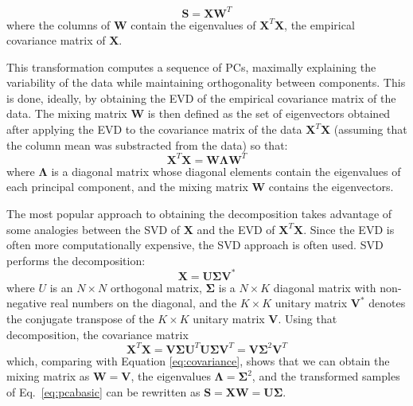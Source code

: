 \begin{equation}\label{eq:pcabasic}
	\mathbf{S}=\mathbf{X}\mathbf{W}^T
\end{equation}
where the columns of $\mathbf{W}$ contain the eigenvalues of $\mathbf{X}^T\mathbf{X}$, the empirical covariance matrix of $\mathbf{X}$. 

This transformation computes a sequence of PCs, maximally explaining the variability of the data while maintaining orthogonality between components. This is done, ideally, by obtaining the \ac{EVD} of the empirical covariance matrix of the data. The mixing matrix $\mathbf{W}$ is then defined as the set of eigenvectors obtained after applying the \ac{EVD} to the covariance matrix of the data $\mathbf{X}^T\mathbf{X}$ (assuming that the column mean was substracted from the data) so that: 
\begin{equation}\label{eq:covariance}
\mathbf{X}^T\mathbf{X} = \mathbf{W}\boldsymbol\Lambda\mathbf{W}^T
\end{equation}
where $\boldsymbol\Lambda$ is a diagonal matrix whose diagonal elements contain the eigenvalues of each principal component, and the mixing matrix $\mathbf{W}$ contains the eigenvectors. 

The most popular approach to obtaining the decomposition takes advantage of some analogies between the \ac{SVD} of $\mathbf{X}$ and the \ac{EVD} of $\mathbf{X}^T\mathbf{X}$. Since the \ac{EVD} is often more computationally expensive, the \ac{SVD} approach is often used. \ac{SVD} performs the decomposition:
\begin{equation}
\mathbf{X} = \mathbf{U} \boldsymbol{\Sigma} \mathbf{V}^* 
\end{equation}
where  $U$ is an $N\times N$ orthogonal matrix,  $\boldsymbol\Sigma$ is a $N\times K$ diagonal matrix with non-negative real numbers on the diagonal, and the $K\times K$ unitary matrix  $\mathbf{V}^*$ denotes the conjugate transpose of the $K\times K$ unitary matrix $\mathbf{V}$.
Using that decomposition, the covariance matrix 
\begin{equation}
\mathbf{X}^T\mathbf{X} = \mathbf{V}\boldsymbol\Sigma\mathbf{U}^T\mathbf{U}\boldsymbol\Sigma\mathbf{V}^T = \mathbf{V}\boldsymbol\Sigma^2\mathbf{V}^T
\end{equation}
which, comparing with Equation \ref{eq:covariance}, shows that we can obtain the mixing matrix as $\mathbf{W} = \mathbf{V}$, the eigenvalues $\boldsymbol\Lambda = \boldsymbol\Sigma^2$, and the transformed samples of Eq.~\ref{eq:pcabasic} can be rewritten as $\mathbf{S} = \mathbf{X}\mathbf{W} = \mathbf{U}\boldsymbol{\Sigma}$. 

